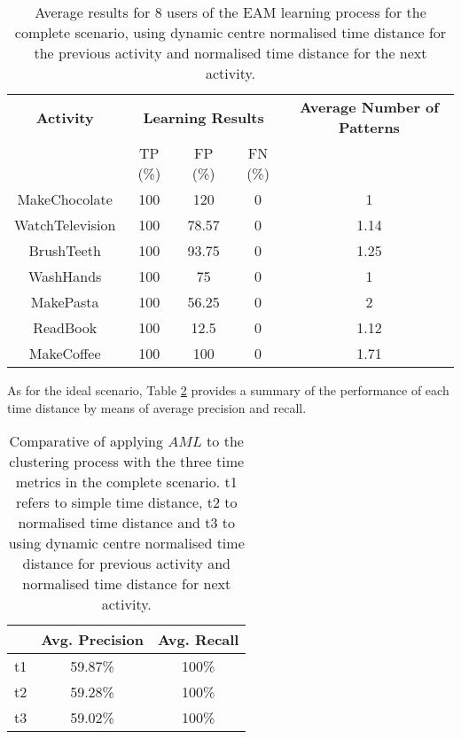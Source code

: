 \begin{table}[htbp]\scriptsize
  \begin{center}
        \begin{tabular}{ccccc}
            \hline            
            \textbf{Activity} & \multicolumn{3}{c}{\textbf{Learning Results}} & \textbf{Average Number of Patterns} \\
             & TP (\%) & FP (\%) & FN (\%) & \\             
            \hline
            MakeChocolate   & 100 & 120   & 0 & 1 \\
	    WatchTelevision & 100 & 78.57 & 0 & 1.14 \\
	    BrushTeeth      & 100 & 93.75 & 0 & 1.25 \\
	    WashHands       & 100 & 75    & 0 & 1 \\
	    MakePasta       & 100 & 56.25 & 0 & 2 \\
	    ReadBook        & 100 & 12.5  & 0 & 1.12 \\
	    MakeCoffee      & 100 & 100   & 0 & 1.71 \\
            \hline
        \end{tabular}                
        \caption{Average results for 8 users of the EAM learning process for the complete scenario, using dynamic centre normalised time distance for the previous activity and normalised time distance for the next activity.}
        \label{tab-rp-comp-t2}
    \end{center}
\end{table}

As for the ideal scenario, Table \ref{tab-aml-comparative-complete} provides a summary of the performance of each time distance by means of average precision and recall. 

\begin{table}[htbp]\scriptsize
\begin{center}
 \begin{tabular}{ccc}
  \hline
   & Avg. Precision & Avg. Recall \\
  \hline
  t1 & 59.87\% & 100\% \\
  t2 & 59.28\% & 100\% \\
  t3 & 59.02\% & 100\% \\
  \hline
 \end{tabular}
 \caption{Comparative of applying $AML$ to the clustering process with the three time metrics in the complete scenario. t1 refers to simple time distance, t2 to normalised time distance and t3 to using dynamic centre normalised time distance for previous activity and normalised time distance for next activity.}
 \label{tab-aml-comparative-complete}
\end{center} 
\end{table}

